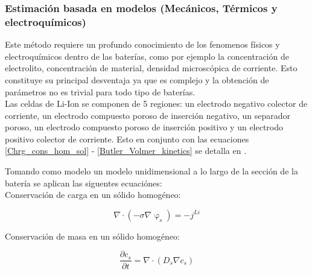 \documentclass[10pt,a4paper]{article}
\begin{document}
	
	\clearpage
	
	\subsubsection{Estimación basada en modelos (Mecánicos, Térmicos y electroquímicos)}
	Este método requiere un profundo conocimiento de los fenomenos físicos y electroquímicos dentro de las baterías, como por ejemplo la concentración de electrolito, concentración de material, densidad microscópica de corriente. Esto constituye su principal desventaja ya que es complejo y la obtención de parámetros no es trivial para todo tipo de baterías.\\
	
	Las celdas de Li-Ion se componen de 5 regiones: un electrodo negativo colector de corriente, un electrodo compuesto poroso de inserción negativo, un separador poroso, un electrodo compuesto poroso de inserción positivo y un electrodo positivo colector de corriente. Esto en conjunto con las ecuaciones \ref{Chrg_cons_hom_sol} - \ref{Butler_Volmer_kinetics} se detalla en \cite{Li2016}.
	
	
	Tomando como modelo un modelo unidimensional a lo largo de la sección de la batería se aplican las siguentes ecuaciónes:\\
	
	
	Conservación de carga en un sólido homogéneo:\\
	\begin{figure}[h!]
		\begin{center}
			\begin{equation}
				\nabla \cdot (-\sigma\nabla\upvarphi_s)=-j^{Li} 
				\label{Chrg_cons_hom_sol}
			\end{equation}	
		\end{center}
	\end{figure}
	
	Conservación de masa en un sólido homogéneo:\\
	
	\begin{figure}[h!]
		\begin{center}
			\begin{equation}
				\frac{\partial c_s}{\partial t}=\nabla \cdot (D_s\nabla c_s) 
				\label{Mass_cons_hom_sol}
			\end{equation}	
		\end{center}
	\end{figure}
	
\end{document}
